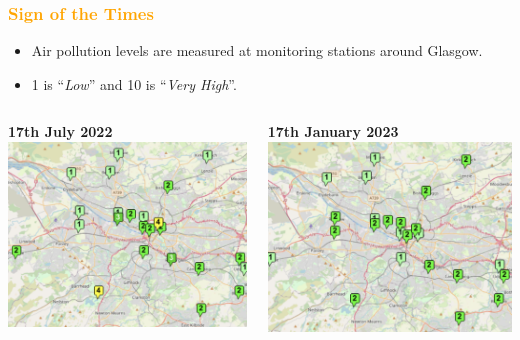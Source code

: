 \documentclass[parskip,12pt]{beamer}
\begin{document}
\begin{frame}
\frametitle{\textcolor{orange}{Sign of the Times}}
 \begin{itemize}
 \vspace{3mm}
\item Air pollution levels are measured at monitoring stations around Glasgow.
\vspace{3mm}
\item 1 is ``\emph{Low}'' and 10 is ``\emph{Very High}''.
\end{itemize}
\begin{columns}
\begin{column}{0.5\textwidth}
    \begin{center}
    \textbf{17th July 2022}
     \includegraphics[width=\textwidth]{GlasgowMap}
          \end{center}
\end{column}
\begin{column}{0.5\textwidth}
    \begin{center}
    \textbf{17th January 2023}
     \includegraphics[width=\textwidth]{GlasgowMap2}

\end{center}
\end{column}
\end{columns}
\end{frame}
\end{document}

